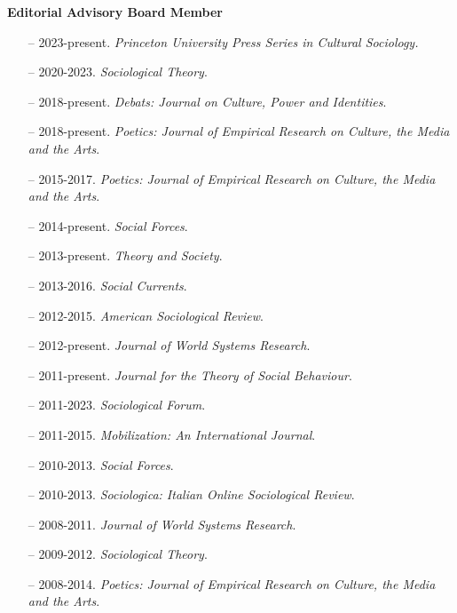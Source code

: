 \medskip
\noindent\textbf{Editorial Advisory Board Member} 

\begin{itemize}[itemsep=-0.5ex]
    \item[--] 2023-present. {\em Princeton University Press Series in Cultural Sociology.}
    \item[--] 2020-2023. {\em Sociological Theory}.
	\item[--] 2018-present. {\em Debats: Journal on Culture, Power and Identities}. 
    \item[--] 2018-present. {\em Poetics: Journal of Empirical Research on Culture, the Media and the Arts}.
    \item[--] 2015-2017. {\em Poetics: Journal of Empirical Research on Culture, the Media and the Arts}.
    \item[--] 2014-present. {\em Social Forces}.
    \item[--] 2013-present.  {\em Theory and Society}.
    \item[--] 2013-2016. {\em Social Currents}.
    \item[--] 2012-2015. {\em American Sociological Review}. 
    \item[--] 2012-present. {\em Journal of World Systems Research}.
    \item[--] 2011-present. {\em Journal for the Theory of Social Behaviour}.
    \item[--] 2011-2023. {\em Sociological Forum}.
    \item[--] 2011-2015. {\em Mobilization: An International Journal}.
    \item[--] 2010-2013. {\em Social Forces}.
    \item[--] 2010-2013. {\em Sociologica: Italian Online Sociological Review}.
    \item[--] 2008-2011. {\em Journal of World Systems Research}.
    \item[--] 2009-2012. {\em Sociological Theory}.
    \item[--] 2008-2014. {\em Poetics: Journal of Empirical Research on Culture, the Media and the Arts}.
\end{itemize}